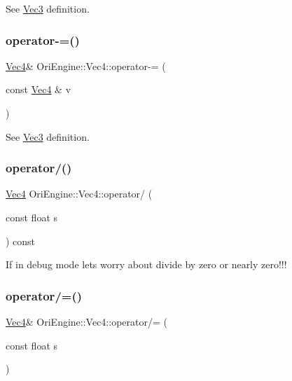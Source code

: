 See \hyperlink{struct_ori_engine_1_1_vec3}{Vec3} definition. 

\hypertarget{struct_ori_engine_1_1_vec4_a213cbae8de217866744a5c83349c4033}{}\label{struct_ori_engine_1_1_vec4_a213cbae8de217866744a5c83349c4033} 
\subsubsection{\texorpdfstring{operator-\/=()}{operator-=()}}
{\footnotesize\ttfamily \hyperlink{struct_ori_engine_1_1_vec4}{Vec4}\& Ori\+Engine\+::\+Vec4\+::operator-\/= (\begin{DoxyParamCaption}\item[{const \hyperlink{struct_ori_engine_1_1_vec4}{Vec4} \&}]{v }\end{DoxyParamCaption})\hspace{0.3cm}{\ttfamily [inline]}}



See \hyperlink{struct_ori_engine_1_1_vec3}{Vec3} definition. 

\hypertarget{struct_ori_engine_1_1_vec4_aa6e144f7ab67f6dfcaf09a02067c5b57}{}\label{struct_ori_engine_1_1_vec4_aa6e144f7ab67f6dfcaf09a02067c5b57} 
\subsubsection{\texorpdfstring{operator/()}{operator/()}}
{\footnotesize\ttfamily \hyperlink{struct_ori_engine_1_1_vec4}{Vec4} Ori\+Engine\+::\+Vec4\+::operator/ (\begin{DoxyParamCaption}\item[{const float}]{s }\end{DoxyParamCaption}) const\hspace{0.3cm}{\ttfamily [inline]}}

If in debug mode let\textquotesingle{}s worry about divide by zero or nearly zero!!! \hypertarget{struct_ori_engine_1_1_vec4_af0fc00ff1ac696f44b2cc2addd9be4bb}{}\label{struct_ori_engine_1_1_vec4_af0fc00ff1ac696f44b2cc2addd9be4bb} 
\subsubsection{\texorpdfstring{operator/=()}{operator/=()}}
{\footnotesize\ttfamily \hyperlink{struct_ori_engine_1_1_vec4}{Vec4}\& Ori\+Engine\+::\+Vec4\+::operator/= (\begin{DoxyParamCaption}\item[{const float}]{s }\end{DoxyParamCaption})\hspace{0.3cm}{\ttfamily [inline]}}

